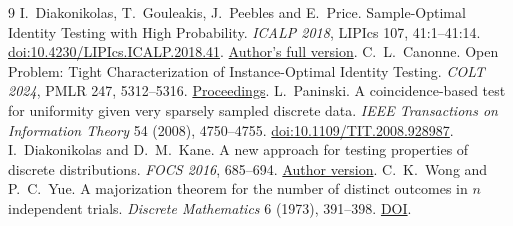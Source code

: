 \documentclass[11pt]{article}
\begin{document}
\begin{thebibliography}{9}
 I.~Diakonikolas, T.~Gouleakis, J.~Peebles and E.~Price. Sample-Optimal Identity Testing with High Probability. \emph{ICALP 2018}, LIPIcs 107, 41:1--41:14. \href{https://doi.org/10.4230/LIPIcs.ICALP.2018.41}{doi:10.4230/LIPIcs.ICALP.2018.41}. \href{https://www.cs.utexas.edu/~ecprice/papers/uniformity.pdf}{Author's full version}.
 C.~L.~Canonne. Open Problem: Tight Characterization of Instance-Optimal Identity Testing. \emph{COLT 2024}, PMLR 247, 5312--5316. \href{https://proceedings.mlr.press/v247/canonne24a.html}{Proceedings}.
 L.~Paninski. A coincidence-based test for uniformity given very sparsely sampled discrete data. \emph{IEEE Transactions on Information Theory} 54 (2008), 4750--4755. \href{https://doi.org/10.1109/TIT.2008.928987}{doi:10.1109/TIT.2008.928987}.
 I.~Diakonikolas and D.~M.~Kane. A new approach for testing properties of discrete distributions. \emph{FOCS 2016}, 685--694. \href{https://cseweb.ucsd.edu/~dakane/testingApproach.pdf}{Author version}.
 C.~K.~Wong and P.~C.~Yue. A majorization theorem for the number of distinct outcomes in $n$ independent trials. \emph{Discrete Mathematics} 6 (1973), 391--398. \href{https://doi.org/10.1016/0012-365X(73)90070-8}{DOI}.
\end{thebibliography}
\end{document}
